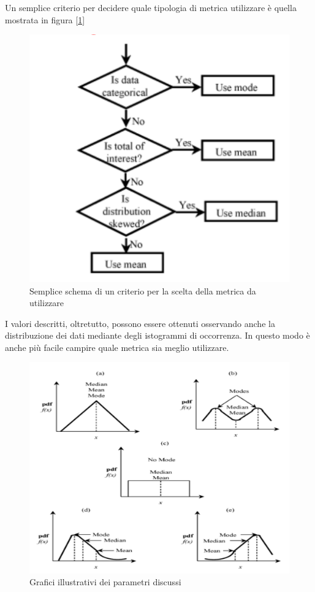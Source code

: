 Un semplice criterio per decidere quale tipologia di metrica utilizzare è quella mostrata in figura [\ref{img:criterio-media-mediana}]

\begin{figure}[h]
\centering
\includegraphics[width=.5\textwidth]{img/criterio-media-mediana.png}
\caption{Semplice schema di un criterio per la scelta della metrica da utilizzare}\label{img:criterio-media-mediana}
\end{figure}

I valori descritti, oltretutto, possono essere ottenuti osservando anche la distribuzione dei dati mediante degli istogrammi di occorrenza. In questo modo è anche più facile campire quale metrica sia meglio utilizzare.

\begin{figure}[H]
\centering
\includegraphics[width=.5\textwidth]{img/grafici-media-mediana.png}
\caption{Grafici illustrativi dei parametri discussi}\label{img:grafici-media-mediana}
\end{figure}

